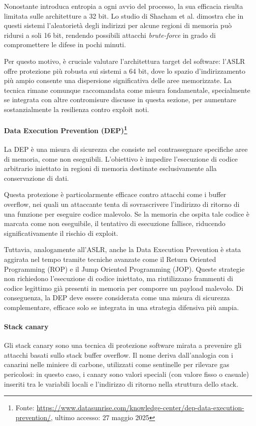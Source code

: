 Nonostante introduca entropia a ogni avvio del processo, la sua efficacia
risulta limitata sulle architetture a 32 bit. Lo studio di Shacham et al.\cite{aslr_effectiveness}
dimostra che in questi sistemi l'aleatorietà degli indirizzi per alcune regioni di
memoria può ridursi a soli 16 bit, rendendo possibili attacchi \textit{brute-force}
in grado di compromettere le difese in pochi minuti.

Per questo motivo, è cruciale valutare l'architettura target del software: l'ASLR
offre protezione più robusta sui sistemi a 64 bit, dove lo spazio d'indirizzamento
più ampio consente una dispersione significativa delle aree memorizzate. La tecnica
rimane comunque raccomandata come misura fondamentale, specialmente se integrata
con altre contromisure discusse in questa sezione, per aumentare sostanzialmente
la resilienza contro exploit noti.

\paragraph{Data Execution Prevention (DEP)\protect\footnote{Fonte: \url{https://www.datasunrise.com/knowledge-center/dep-data-execution-prevention/},
ultimo accesso: 27 maggio 2025}}
La DEP è una misura di sicurezza che consiste nel contrassegnare specifiche aree
di memoria, come non eseguibili. L'obiettivo è impedire l'esecuzione di codice
arbitrario iniettato in regioni di memoria destinate esclusivamente alla
conservazione di dati.

Questa protezione è particolarmente efficace contro attacchi come i buffer
overflow, nei quali un attaccante tenta di sovrascrivere l'indirizzo di ritorno di
una funzione per eseguire codice malevolo. Se la memoria che ospita tale codice
è marcata come non eseguibile, il tentativo di esecuzione fallisce, riducendo
significativamente il rischio di exploit.

Tuttavia, analogamente all'ASLR, anche la Data Execution Prevention è stata
aggirata nel tempo tramite tecniche avanzate come il Return Oriented Programming
(ROP) e il Jump Oriented Programming (JOP). Queste strategie non richiedono l'esecuzione
di codice iniettato, ma riutilizzano frammenti di codice legittimo già presenti
in memoria per comporre un payload malevolo. Di conseguenza, la DEP deve essere
considerata come una misura di sicurezza complementare, efficace solo se integrata
in una strategia difensiva più ampia.

\paragraph{Stack canary}
Gli stack canary sono una tecnica di protezione software mirata a prevenire gli
attacchi basati sullo stack buffer overflow. Il nome deriva dall'analogia con i canarini
nelle miniere di carbone, utilizzati come sentinelle per rilevare gas pericolosi:
in questo caso, i canary sono valori speciali (con valore fisso o casuale)
inseriti tra le variabili locali e l'indirizzo di ritorno nella struttura dello
stack.

